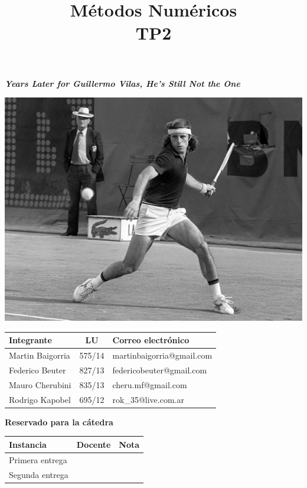 \documentclass[10pt,a4paper]{article}
\title{Métodos Numéricos \\ TP2}
\begin{document}
\maketitle

\vskip 10pt
\begin{center}
\textbf{\Large \emph{Years Later for Guillermo Vilas, He’s Still Not the One}}
\end{center}

\begin{center}
\includegraphics[scale=5]{images/vilas.jpg}
\end{center}

\bigskip

\begin{table}[h]
\centering
\begin{tabular}{|l l l|}
\hline
Integrante       & \multicolumn{1}{c}{LU}     & Correo electrónico        \\ \hline
Martin Baigorria & \multicolumn{1}{c}{575/14} & martinbaigorria@gmail.com \\ 
Federico Beuter & 827/13                      & federicobeuter@gmail.com \\
Mauro Cherubini & 835/13                      & cheru.mf@gmail.com \\ 
Rodrigo Kapobel & 695/12                      & rok\_35@live.com.ar \\  \hline
\end{tabular}
\end{table}

\begin{center}
\textbf{Reservado para la cátedra}
\end{center}
\begin{table}[h]
\centering
\begin{tabular}{|l|l|l|}
\hline
Instancia       & Docente & Nota \\ \hline
Primera entrega &         &      \\ \hline
Segunda entrega &         &      \\ \hline
\end{tabular}
\end{table}
\end{document}
